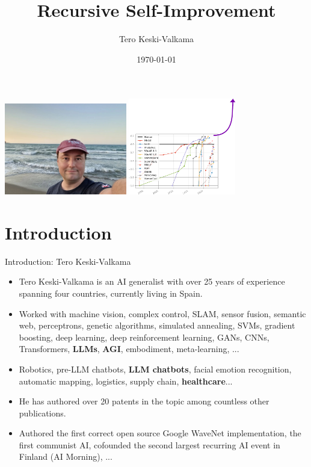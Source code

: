 \documentclass{beamer}
\begin{document}
\title{Recursive Self-Improvement}
\author{Tero Keski-Valkama}
\date{\today}

\begin{frame}
  \titlepage
  \hspace{0.1cm}\includegraphics[height=4cm]{tero.jpg}
  \hspace{0.1cm}\includegraphics[height=4.2cm]{recursive2.png}

  \end{frame}

\section{Introduction}
\begin{frame}{Introduction: Tero Keski-Valkama}
  \begin{itemize}
    \item Tero Keski-Valkama is an AI generalist with over 25 years of experience spanning four countries, currently living in Spain.
    \item Worked with machine vision, complex control, SLAM, sensor fusion, semantic web, perceptrons, genetic algorithms, simulated annealing, SVMs, gradient boosting, deep learning, deep reinforcement learning, GANs, CNNs, Transformers, \textbf{LLMs}, \textbf{AGI}, embodiment, meta-learning, ...
    \item Robotics, pre-LLM chatbots, \textbf{LLM chatbots}, facial emotion recognition, automatic mapping, logistics, supply chain, \textbf{healthcare}...
    \item He has authored over 20 patents in the topic among countless other publications.
    \item Authored the first correct open source Google WaveNet implementation, the first communist AI, cofounded the second largest recurring AI event in Finland (AI Morning), ...
  \end{itemize}
\end{frame}
\end{document}
